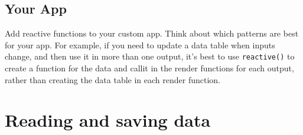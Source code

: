 \documentclass[
  oneside]{book}
\newenvironment{Shaded}{\begin{snugshade}}{\end{snugshade}}
\newcommand{\AttributeTok}[1]{\textcolor[rgb]{0.77,0.63,0.00}{#1}}
\newcommand{\ConstantTok}[1]{\textcolor[rgb]{0.00,0.00,0.00}{#1}}
\newcommand{\ControlFlowTok}[1]{\textcolor[rgb]{0.13,0.29,0.53}{\textbf{#1}}}
\newcommand{\FunctionTok}[1]{\textcolor[rgb]{0.00,0.00,0.00}{#1}}
\newcommand{\NormalTok}[1]{#1}
\newcommand{\OtherTok}[1]{\textcolor[rgb]{0.56,0.35,0.01}{#1}}
\newcommand{\SpecialCharTok}[1]{\textcolor[rgb]{0.00,0.00,0.00}{#1}}
\newcommand{\StringTok}[1]{\textcolor[rgb]{0.31,0.60,0.02}{#1}}
\begin{document}
\begin{Shaded}
\end{Shaded}

\hypertarget{your-app-reactive}{%
\section{Your App}\label{your-app-reactive}}

Add reactive functions to your custom app. Think about which patterns are best for your app. For example, if you need to update a data table when inputs change, and then use it in more than one output, it's best to use \texttt{reactive}\texttt{()} to create a function for the data and callit in the render functions for each output, rather than creating the data table in each render function.

\hypertarget{data}{%
\chapter{Reading and saving data}\label{data}}
\end{document}

